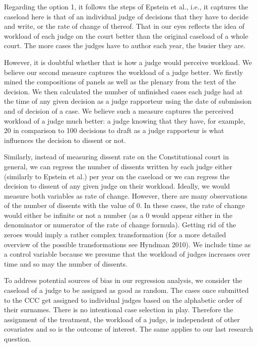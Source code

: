 \documentclass[
  11pt,
]{article}
\begin{document}
Regarding the option 1, it follows the steps of Epstein et al., i.e., it
captures the caseload here is that of an individual judge of decisions
that they have to decide and write, or the rate of change of thereof.
That in our eyes reflects the idea of workload of each judge on the
court better than the original caseload of a whole court. The more cases
the judges have to author each year, the busier they are.

However, it is doubtful whether that is how a judge would perceive
workload. We believe our second measure captures the workload of a judge
better. We firstly mined the compositions of panels as well as the
plenary from the text of the decision. We then calculated the number of
unfinished cases each judge had at the time of any given decision as a
judge rapporteur using the date of submission and of decision of a case.
We believe such a measure captures the perceived workload of a judge
much better: a judge knowing that they have, for example, 20 in
comparison to 100 decisions to draft as a judge rapporteur is what
influences the decision to dissent or not.

Similarly, instead of measuring dissent rate on the Constitutional court
in general, we can regress the number of dissents written by each judge
either (similarly to Epstein et al.) per year on the caseload or we can
regress the decision to dissent of any given judge on their workload.
Ideally, we would measure both variables as rate of change. However,
there are many observations of the number of dissents with the value of
0. In these cases, the rate of change would either be infinite or not a
number (as a 0 would appear either in the denominator or numerator of
the rate of change formula). Getting rid of the zeroes would imply a
rather complex transformation (for a more detailed overview of the
possible transformations see Hyndman 2010). We include time as a control
variable because we presume that the workload of judges increases over
time and so may the number of dissents.

To address potential sources of bias in our regression analysis, we
consider the caseload of a judge to be assigned as good as random. The
cases once submitted to the CCC get assigned to individual judges based
on the alphabetic order of their surnames. There is no intentional case
selection in play. Therefore the assignment of the treatment, the
workload of a judge, is independent of other covariates and so is the
outcome of interest. The same applies to our last research question.
\end{document}
